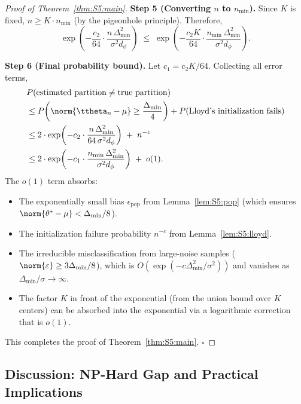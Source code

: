 \begin{proof}[Proof of Theorem~\ref{thm:S5:main}]
\noindent\textbf{Step 5 (Converting $n$ to $n_{\min}$).}
Since $K$ is fixed, $n\ge K\cdot n_{\min}$ (by the pigeonhole principle).
Therefore,
\[
\exp\!\left(-\frac{c_2}{64}\cdot\frac{n\,\Delta_{\min}^2}{\sigma^2 d_\phi}\right)
\;\le\; \exp\!\left(-\frac{c_2 K}{64}\cdot
              \frac{n_{\min}\,\Delta_{\min}^2}{\sigma^2 d_\phi}\right).
\]

\noindent\textbf{Step 6 (Final probability bound).}
Let $c_1 = c_2 K / 64$.  Collecting all error terms,
\begin{align*}
&P(\text{estimated partition}\neq\text{true partition}) \\
&\le P\!\left(\norm{\ttheta_n-\mu}\ge\frac{\Delta_{\min}}{4}\right)
   + P(\text{Lloyd's initialization fails}) \\
&\le 2\cdot\exp\!\left(-c_2\cdot\frac{n\,\Delta_{\min}^2}{64\,\sigma^2 d_\phi}\right)
   \;+\; n^{-c} \\
&\le 2\cdot\exp\!\left(-c_1\cdot\frac{n_{\min}\,\Delta_{\min}^2}
                                {\sigma^2 d_\phi}\right)
   \;+\; o(1).
\end{align*}
The $o(1)$ term absorbs:
\begin{itemize}
\item The exponentially small bias $\epsilon_{\mathrm{pop}}$ from
Lemma~\ref{lem:S5:pop} (which ensures
$\norm{\theta^*-\mu}<\Delta_{\min}/8$).
\item The initialization failure probability $n^{-c}$ from
Lemma~\ref{lem:S5:lloyd}.
\item The irreducible misclassification from large-noise samples
($\norm{\varepsilon}\ge3\Delta_{\min}/8$), which is
$O(\exp(-c\Delta_{\min}^2/\sigma^2))$ and vanishes as
$\Delta_{\min}/\sigma\to\infty$.
\item The factor $K$ in front of the exponential (from the union bound
over $K$ centers) can be absorbed into the exponential via a
logarithmic correction that is $o(1)$.
\end{itemize}
This completes the proof of Theorem~\ref{thm:S5:main}.  \hfill$\square$
\end{proof}

\subsection{Discussion: NP-Hard Gap and Practical Implications}
\label{sec:S5:disc}

